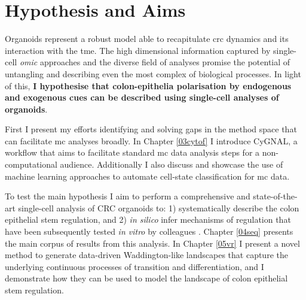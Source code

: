 
\newpage
\section{Hypothesis and Aims}


Organoids represent a robust model able to recapitulate \acrshort{crc} dynamics and its interaction with the \acrshort{tme}. The high dimensional information captured by single-cell \emph{omic} approaches and the diverse field of analyses promise the potential of untangling and describing even the most complex of biological processes. 
In light of this, \textbf{I hypothesise that colon-epithelia polarisation by endogenous and exogenous cues can be described using single-cell analyses of organoids}.

First I present my efforts identifying and solving gaps in the method space that can facilitate \acrlong{mc} analyses broadly. In Chapter \ref{03cytof} I introduce CyGNAL, a workflow that aims to facilitate standard \acrshort{mc} data analysis steps for a non-computational audience. Additionally I also discuss and showcase the use of machine learning approaches to automate cell-state classification for \acrshort{mc} data.

To test the main hypothesis I aim to perform a comprehensive and state-of-the-art single-cell analysis of CRC organoids to: 1) systematically describe the colon epithelial stem regulation, and 2) \emph{in silico} infer mechanisms of regulation that have been subsequently tested \emph{in vitro} by colleagues \cite{cardoso_rodriguez_single-cell_2023}. 
Chapter \ref{04seq} presents the main corpus of results from this analysis.
In Chapter \ref{05vr} I present a novel method to generate data-driven Waddington-like landscapes that capture the underlying continuous processes of transition and differentiation, and I demonstrate how they can be used to model the landscape of colon epithelial stem regulation.

